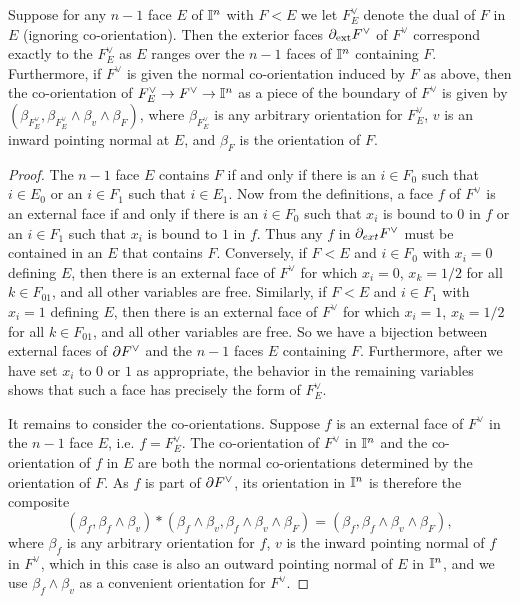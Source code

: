 \begin{lemma}\label{L: ext faces}
Suppose for any $n-1$ face $E$ of $\mathbb{I}^n$ with $F<E$ we let $F_E^\vee$ denote the dual of $F$ in $E$ (ignoring co-orientation). Then the exterior faces $\partial_{\text{ext}}F^\vee$ of $F^\vee$ correspond exactly to the $F_E^\vee$ as $E$ ranges over the $n-1$ faces of $\mathbb{I}^n$ containing $F$. Furthermore, if $F^\vee$ is given the normal co-orientation induced by $F$ as above, then the co-orientation of $F^\vee_E\to F^\vee\to \mathbb{I}^n$ as a piece of the boundary of $F^\vee$ is given by $(\beta_{F_E^\vee},\beta_{F_E^\vee}\wedge\beta_v\wedge \beta_F)$, where $\beta_{F_E^\vee}$ is any arbitrary orientation for $F_E^\vee$, $v$ is an inward pointing normal at $E$, and $\beta_F$ is the orientation of $F$.  
\end{lemma}
\begin{proof}
The $n-1$ face  $E$ contains $F$ if and only if there is an $i\in F_0$ such that $i\in E_0$ or an $i\in F_1$ such that $i\in E_1$. Now from the definitions, a face $f$ of $F^\vee$ is an external face if and only if there is an $i\in F_0$ such that $x_i$ is bound to $0$ in $f$ or an $i\in F_1$ such that $x_i$ is bound to $1$ in $f$. Thus any $f$ in $\partial_{ext}F^\vee$ must be contained in an $E$ that contains $F$. Conversely, if $F<E$ and $i\in F_0$ with $x_i=0$ defining $E$, then there is an external face of $F^\vee$ for which $x_i=0$, $x_k=1/2$ for all $k\in F_{01}$, and all other variables are free. Similarly, if $F<E$ and $i\in F_1$ with $x_i=1$ defining $E$, then there is an external face of $F^\vee$ for which $x_i=1$, $x_k=1/2$ for all $k\in F_{01}$, and all other variables are free. So we have a bijection between external faces of $\partial F^\vee$ and the $n-1$ faces $E$ containing $F$. Furthermore, after we have set $x_i$ to $0$ or $1$ as appropriate, the behavior in the remaining variables shows that such a face has precisely the form of $F^\vee_E$.

It remains to consider the co-orientations. Suppose $f$ is an external face of $F^\vee$ in the $n-1$ face $E$, i.e. $f=F^\vee_E$. The co-orientation of $F^\vee$ in $\mathbb{I}^n$ and the co-orientation of $f$ in $E$ are both the normal co-orientations determined by the orientation of $F$. As $f$ is part of $\partial F^\vee$, its orientation in $\mathbb{I}^n$ is therefore the composite $$(\beta_f,\beta_f\wedge\beta_v)*(\beta_f\wedge\beta_v,\beta_f\wedge\beta_v\wedge \beta_F)=(\beta_f,\beta_f\wedge\beta_v\wedge \beta_F),$$ where $\beta_f$ is any arbitrary orientation for $f$, $v$ is the inward pointing normal of $f$ in $F^\vee$, which in this case is also an outward pointing normal of $E$ in $\mathbb{I}^n$, and we use $\beta_f\wedge\beta_v$ as a convenient orientation for $F^\vee$.
\end{proof}


